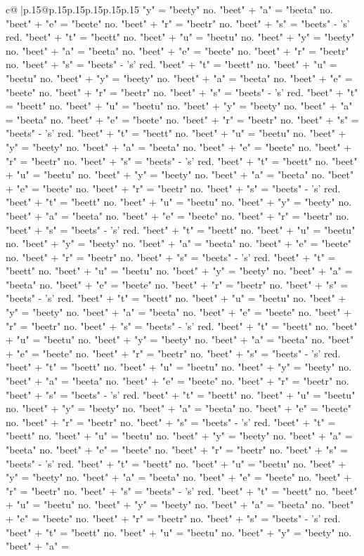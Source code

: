 \documentclass{article}
\begin{document}
{\begin{supertabular}{c@{$\;$}|p{.15\linewidth}@{}p{.15\linewidth}p{.15\linewidth}p{.15\linewidth}p{.15\linewidth}p{.15\linewidth}}
{{{"y" = "beety" no. "beet" + "a" = "beeta" no. "beet" + "e" = "beete" no. "beet" + "r" = "beetr" no. "beet" + "s" = "beets" {-} 's' red. "beet" + "t" = "beett" no. "beet" + "u" = "beetu" no. "beet" + "y" = "beety" no. "beet" + "a" = "beeta" no. "beet" + "e" = "beete" no. "beet" + "r" = "beetr" no. "beet" + "s" = "beets" {-} 's' red. "beet" + "t" = "beett" no. "beet" + "u" = "beetu" no. "beet" + "y" = "beety" no. "beet" + "a" = "beeta" no. "beet" + "e" = "beete" no. "beet" + "r" = "beetr" no. "beet" + "s" = "beets" {-} 's' red. "beet" + "t" = "beett" no. "beet" + "u" = "beetu" no. "beet" + "y" = "beety" no. "beet" + "a" = "beeta" no. "beet" + "e" = "beete" no. "beet" + "r" = "beetr" no. "beet" + "s" = "beets" {-} 's' red. "beet" + "t" = "beett" no. "beet" + "u" = "beetu" no. "beet" + "y" = "beety" no. "beet" + "a" = "beeta" no. "beet" + "e" = "beete" no. "beet" + "r" = "beetr" no. "beet" + "s" = "beets" {-} 's' red. "beet" + "t" = "beett" no. "beet" + "u" = "beetu" no. "beet" + "y" = "beety" no. "beet" + "a" = "beeta" no. "beet" + "e" = "beete" no. "beet" + "r" = "beetr" no. "beet" + "s" = "beets" {-} 's' red. "beet" + "t" = "beett" no. "beet" + "u" = "beetu" no. "beet" + "y" = "beety" no. "beet" + "a" = "beeta" no. "beet" + "e" = "beete" no. "beet" + "r" = "beetr" no. "beet" + "s" = "beets" {-} 's' red. "beet" + "t" = "beett" no. "beet" + "u" = "beetu" no. "beet" + "y" = "beety" no. "beet" + "a" = "beeta" no. "beet" + "e" = "beete" no. "beet" + "r" = "beetr" no. "beet" + "s" = "beets" {-} 's' red. "beet" + "t" = "beett" no. "beet" + "u" = "beetu" no. "beet" + "y" = "beety" no. "beet" + "a" = "beeta" no. "beet" + "e" = "beete" no. "beet" + "r" = "beetr" no. "beet" + "s" = "beets" {-} 's' red. "beet" + "t" = "beett" no. "beet" + "u" = "beetu" no. "beet" + "y" = "beety" no. "beet" + "a" = "beeta" no. "beet" + "e" = "beete" no. "beet" + "r" = "beetr" no. "beet" + "s" = "beets" {-} 's' red. "beet" + "t" = "beett" no. "beet" + "u" = "beetu" no. "beet" + "y" = "beety" no. "beet" + "a" = "beeta" no. "beet" + "e" = "beete" no. "beet" + "r" = "beetr" no. "beet" + "s" = "beets" {-} 's' red. "beet" + "t" = "beett" no. "beet" + "u" = "beetu" no. "beet" + "y" = "beety" no. "beet" + "a" = "beeta" no. "beet" + "e" = "beete" no. "beet" + "r" = "beetr" no. "beet" + "s" = "beets" {-} 's' red. "beet" + "t" = "beett" no. "beet" + "u" = "beetu" no. "beet" + "y" = "beety" no. "beet" + "a" = "beeta" no. "beet" + "e" = "beete" no. "beet" + "r" = "beetr" no. "beet" + "s" = "beets" {-} 's' red. "beet" + "t" = "beett" no. "beet" + "u" = "beetu" no. "beet" + "y" = "beety" no. "beet" + "a" = "beeta" no. "beet" + "e" = "beete" no. "beet" + "r" = "beetr" no. "beet" + "s" = "beets" {-} 's' red. "beet" + "t" = "beett" no. "beet" + "u" = "beetu" no. "beet" + "y" = "beety" no. "beet" + "a" = "beeta" no. "beet" + "e" = "beete" no. "beet" + "r" = "beetr" no. "beet" + "s" = "beets" {-} 's' red. "beet" + "t" = "beett" no. "beet" + "u" = "beetu" no. "beet" + "y" = "beety" no. "beet" + "a" = "beeta" no. "beet" + "e" = "beete" no. "beet" + "r" = "beetr" no. "beet" + "s" = "beets" {-} 's' red. "beet" + "t" = "beett" no. "beet" + "u" = "beetu" no. "beet" + "y" = "beety" no. "beet" + "a" = }}}
\end{supertabular}}
\end{document}
